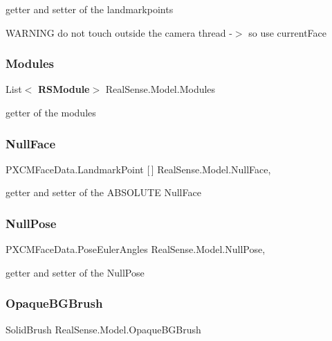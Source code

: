 getter and setter of the landmarkpoints

W\+A\+R\+N\+I\+NG do not touch outside the camera thread -\/$>$ so use current\+Face \mbox{\label{class_real_sense_1_1_model_a9664e53331481e9cc45ad6d3540c218c}} 
\subsubsection{Modules}
{\footnotesize\ttfamily List$<$\textbf{ R\+S\+Module}$>$ Real\+Sense.\+Model.\+Modules\hspace{0.3cm}{\ttfamily [get]}}

getter of the modules \mbox{\label{class_real_sense_1_1_model_af626df64a18cb2fcf4cbc06ffbadfa17}} 
\subsubsection{Null\+Face}
{\footnotesize\ttfamily P\+X\+C\+M\+Face\+Data.\+Landmark\+Point [$\,$] Real\+Sense.\+Model.\+Null\+Face\hspace{0.3cm}{\ttfamily [get]}, {\ttfamily [set]}}

getter and setter of the A\+B\+S\+O\+L\+U\+TE Null\+Face \mbox{\label{class_real_sense_1_1_model_af6cb31aea9e1e0fd3ef87c9380e92193}} 
\subsubsection{Null\+Pose}
{\footnotesize\ttfamily P\+X\+C\+M\+Face\+Data.\+Pose\+Euler\+Angles Real\+Sense.\+Model.\+Null\+Pose\hspace{0.3cm}{\ttfamily [get]}, {\ttfamily [set]}}

getter and setter of the Null\+Pose \mbox{\label{class_real_sense_1_1_model_a14272eb96159aac12a818e2e15c36cb0}} 
\subsubsection{Opaque\+B\+G\+Brush}
{\footnotesize\ttfamily Solid\+Brush Real\+Sense.\+Model.\+Opaque\+B\+G\+Brush\hspace{0.3cm}{\ttfamily [get]}}

